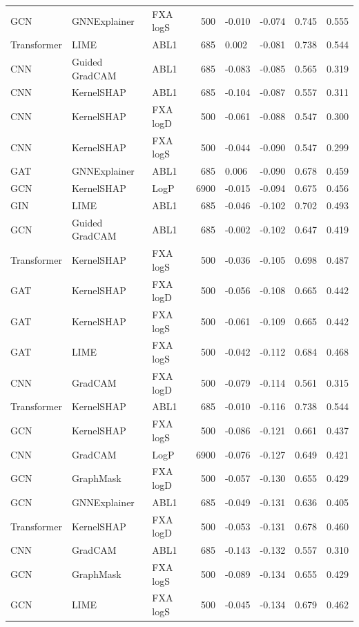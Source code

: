 \begin{table}
\begin{tabular}{lllrllll}
GCN & GNNExplainer & FXA logS & 500 & -0.010 & -0.074 & 0.745 & 0.555 \\
Transformer & LIME & ABL1 & 685 & 0.002 & -0.081 & 0.738 & 0.544 \\
CNN & Guided GradCAM & ABL1 & 685 & -0.083 & -0.085 & 0.565 & 0.319 \\
CNN & KernelSHAP & ABL1 & 685 & -0.104 & -0.087 & 0.557 & 0.311 \\
CNN & KernelSHAP & FXA logD & 500 & -0.061 & -0.088 & 0.547 & 0.300 \\
CNN & KernelSHAP & FXA logS & 500 & -0.044 & -0.090 & 0.547 & 0.299 \\
GAT & GNNExplainer & ABL1 & 685 & 0.006 & -0.090 & 0.678 & 0.459 \\
GCN & KernelSHAP & LogP & 6900 & -0.015 & -0.094 & 0.675 & 0.456 \\
GIN & LIME & ABL1 & 685 & -0.046 & -0.102 & 0.702 & 0.493 \\
GCN & Guided GradCAM & ABL1 & 685 & -0.002 & -0.102 & 0.647 & 0.419 \\
Transformer & KernelSHAP & FXA logS & 500 & -0.036 & -0.105 & 0.698 & 0.487 \\
GAT & KernelSHAP & FXA logD & 500 & -0.056 & -0.108 & 0.665 & 0.442 \\
GAT & KernelSHAP & FXA logS & 500 & -0.061 & -0.109 & 0.665 & 0.442 \\
GAT & LIME & FXA logS & 500 & -0.042 & -0.112 & 0.684 & 0.468 \\
CNN & GradCAM & FXA logD & 500 & -0.079 & -0.114 & 0.561 & 0.315 \\
Transformer & KernelSHAP & ABL1 & 685 & -0.010 & -0.116 & 0.738 & 0.544 \\
GCN & KernelSHAP & FXA logS & 500 & -0.086 & -0.121 & 0.661 & 0.437 \\
CNN & GradCAM & LogP & 6900 & -0.076 & -0.127 & 0.649 & 0.421 \\
GCN & GraphMask & FXA logD & 500 & -0.057 & -0.130 & 0.655 & 0.429 \\
GCN & GNNExplainer & ABL1 & 685 & -0.049 & -0.131 & 0.636 & 0.405 \\
Transformer & KernelSHAP & FXA logD & 500 & -0.053 & -0.131 & 0.678 & 0.460 \\
CNN & GradCAM & ABL1 & 685 & -0.143 & -0.132 & 0.557 & 0.310 \\
GCN & GraphMask & FXA logS & 500 & -0.089 & -0.134 & 0.655 & 0.429 \\
GCN & LIME & FXA logS & 500 & -0.045 & -0.134 & 0.679 & 0.462 \\

\end{tabular}
\end{table}
